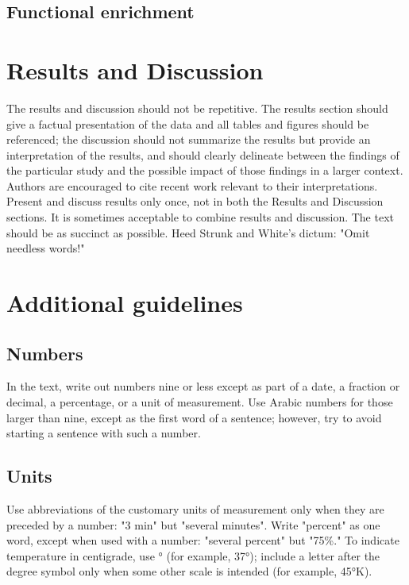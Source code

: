 \documentclass[9pt,twocolumn,twoside]{gsajnl}
\begin{document}
\subsection*{Functional enrichment}

\section*{Results and Discussion}

The results and discussion should not be repetitive. The results section should give a factual presentation of the data and all tables and figures should be referenced; the discussion should not summarize the results but provide an interpretation of the results, and should clearly delineate between the findings of the particular study and the possible impact of those findings in a larger context. Authors are encouraged to cite recent work relevant to their interpretations. Present and discuss results only once, not in both the Results and Discussion sections. It is sometimes acceptable to combine results and discussion. The text should be as succinct as possible. Heed Strunk and White's dictum: "Omit needless words!"

\section*{Additional guidelines}

\subsection*{Numbers} In the text, write out numbers nine or less except as part of a date, a fraction or decimal, a percentage, or a unit of measurement. Use Arabic numbers for those larger than nine, except as the first word of a sentence; however, try to avoid starting a sentence with such a number.

\subsection*{Units} Use abbreviations of the customary units of measurement only when they are preceded by a number: "3 min" but "several minutes". Write "percent" as one word, except when used with a number: "several percent" but "75\%." To indicate temperature in centigrade, use ° (for example, 37°); include a letter after the degree symbol only when some other scale is intended (for example, 45°K).
\end{document}
